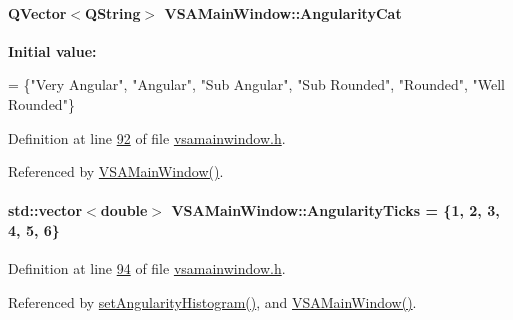 \paragraph[{Angularity\+Cat}]{\setlength{\rightskip}{0pt plus 5cm}Q\+Vector$<$Q\+String$>$ V\+S\+A\+Main\+Window\+::\+Angularity\+Cat\hspace{0.3cm}{\ttfamily [private]}}\label{class_v_s_a_main_window_ab30d8e8d4b71e2aaad2efa825286e64d}
{\bfseries Initial value\+:}
\begin{DoxyCode}
= \{\textcolor{stringliteral}{"Very Angular"}, \textcolor{stringliteral}{"Angular"}, \textcolor{stringliteral}{"Sub Angular"},
                                    \textcolor{stringliteral}{"Sub Rounded"},  \textcolor{stringliteral}{"Rounded"}, \textcolor{stringliteral}{"Well Rounded"}\}
\end{DoxyCode}


Definition at line \hyperlink{vsamainwindow_8h_source_l00092}{92} of file \hyperlink{vsamainwindow_8h_source}{vsamainwindow.\+h}.



Referenced by \hyperlink{vsamainwindow_8cpp_source_l00004}{V\+S\+A\+Main\+Window()}.

\hypertarget{class_v_s_a_main_window_ab3adb6772a4766285b7b96e0fb407f62}{}
\paragraph[{Angularity\+Ticks}]{\setlength{\rightskip}{0pt plus 5cm}std\+::vector$<$double$>$ V\+S\+A\+Main\+Window\+::\+Angularity\+Ticks = \{1, 2, 3, 4, 5, 6\}\hspace{0.3cm}{\ttfamily [private]}}\label{class_v_s_a_main_window_ab3adb6772a4766285b7b96e0fb407f62}


Definition at line \hyperlink{vsamainwindow_8h_source_l00094}{94} of file \hyperlink{vsamainwindow_8h_source}{vsamainwindow.\+h}.



Referenced by \hyperlink{vsamainwindow_8cpp_source_l00315}{set\+Angularity\+Histogram()}, and \hyperlink{vsamainwindow_8cpp_source_l00004}{V\+S\+A\+Main\+Window()}.

\hypertarget{class_v_s_a_main_window_a2202203116e6126f9361de629986b7b4}{}
